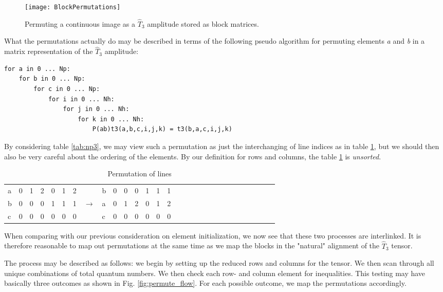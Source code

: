 \begin{figure}[hbtp]
    \centering
    \texttt{[image: BlockPermutations]}
    \caption{Permuting a continuous image as a $\hat{T}_3$ amplitude stored as block matrices.}
    \label{fig:BlockPermutations}
\end{figure}

What the permutations actually do may be described in terms of the
following pseudo algorithm for permuting elements \emph{a} and
\emph{b} in a matrix representation of the $\hat{T}_3$ amplitude:

\begin{verbatim}
for a in 0 ... Np:
    for b in 0 ... Np:
        for c in 0 ... Np:
            for i in 0 ... Nh:
                for j in 0 ... Nh:
                    for k in 0 ... Nh:
                        P(ab)t3(a,b,c,i,j,k) = t3(b,a,c,i,j,k)
\end{verbatim}

By considering table \ref{tab:np3}, we may view such a permutation as
just the interchanging of line indices as in table \ref{tab:np33}, but
we should then also be very careful about the ordering of the
elements. By our definition for rows and columns, the table
\ref{tab:np33} is \emph{unsorted}.

\begin{table}[]
\centering
\caption{Permutation of lines }
\label{tab:np33}
\begin{tabular}{lllllllllllllllllllllllllllll}
a &0&  1&  2&  0&  1&  2& &b & 0&  0&  0&  1&  1&  1&   \\
b & 0&  0&  0&  1&  1&  1& $\rightarrow $&a &0&  1&  2&  0&  1&  2& \\
c & 0&  0&  0&  0&  0&  0&&c & 0&  0&  0&  0&  0&  0& \\
\end{tabular}
\end{table}

When comparing with our previous consideration on element
initialization, we now see that these two processes are
interlinked. It is therefore reasonable to map out permutations at the
same time as we map the blocks in the "natural" alignment of the $\hat{T}_3$
tensor.

The process may be described as follows: we begin by setting up the
reduced rows and columns for the tensor. We then scan through all
unique combinations of total quantum numbers. We then check each row-
and column element for inequalities. This testing may have basically
three outcomes as shown in Fig. \ref{fig:permute_flow}. For each
possible outcome, we map the permutations accordingly.

